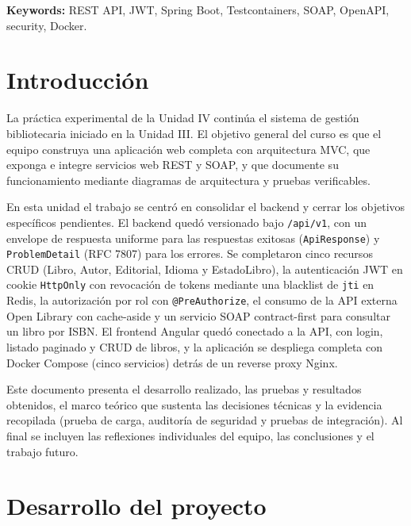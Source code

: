 \documentclass[12pt,a4paper]{article}
\begin{document}
\textbf{Keywords:} REST API, JWT, Spring Boot, Testcontainers, SOAP, OpenAPI,
security, Docker.

\newpage

\section{Introducción}

La práctica experimental de la Unidad IV continúa el sistema de gestión bibliotecaria
iniciado en la Unidad III. El objetivo general del curso es que el equipo construya una
aplicación web completa con arquitectura MVC, que exponga e integre servicios web REST
y SOAP, y que documente su funcionamiento mediante diagramas de arquitectura y pruebas
verificables.

En esta unidad el trabajo se centró en consolidar el backend y cerrar los objetivos
específicos pendientes. El backend quedó versionado bajo \texttt{/api/v1}, con un
envelope de respuesta uniforme para las respuestas exitosas (\texttt{ApiResponse}) y
\texttt{ProblemDetail} (RFC 7807) para los errores. Se completaron cinco recursos CRUD
(Libro, Autor, Editorial, Idioma y EstadoLibro), la autenticación JWT en cookie
\texttt{HttpOnly} con revocación de tokens mediante una blacklist de \texttt{jti} en
Redis, la autorización por rol con \texttt{@PreAuthorize}, el consumo de la API externa
Open Library con cache-aside y un servicio SOAP contract-first para consultar un libro
por ISBN. El frontend Angular quedó conectado a la API, con login, listado paginado y
CRUD de libros, y la aplicación se despliega completa con Docker Compose (cinco
servicios) detrás de un reverse proxy Nginx.

Este documento presenta el desarrollo realizado, las pruebas y resultados obtenidos, el
marco teórico que sustenta las decisiones técnicas y la evidencia recopilada (prueba de
carga, auditoría de seguridad y pruebas de integración). Al final se incluyen las
reflexiones individuales del equipo, las conclusiones y el trabajo futuro.

\newpage

\section{Desarrollo del proyecto}
\end{document}
